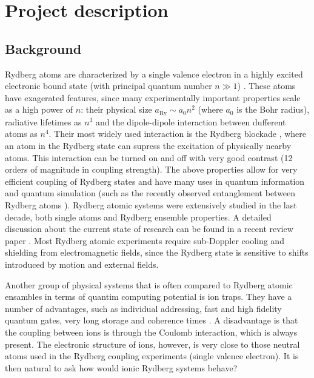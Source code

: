 \section{Project description}

\subsection{Background}

Rydberg atoms are characterized by a single valence electron in a highly excited electronic bound state (with principal quantum number $n \gg 1$) \cite{Gallagher1994}. These atoms have exagerated features, since many experimentally important properties scale as a high power of $n$: their physical size $a_{\mathrm{Ry}} \sim a_0 n^2$ (where $a_0$ is the Bohr radius), radiative lifetimes as $n^3$ and the dipole-dipole interaction between dufferent atoms as $n^4$. Their most widely used interaction is the Rydberg blockade \cite{Jaksch2000}, where an atom in the Rydberg state can supress the excitation of physically nearby atoms. This interaction can be turned on and off with very good contrast (12 orders of magnitude in coupling strength). The above properties allow for very efficient coupling of Rydberg states and have many uses in quantum information and quantum simulation (such as the recently observed entanglement between Rydberg atoms \cite{Wilk2010}). Rydberg atomic systems were extensively studied in the last decade, both single atoms and Rydberg ensemble properties. A detailed discussion about the current state of research can be found in a recent review paper \cite{Saffman2010}. Most Rydberg atomic experiments require sub-Doppler cooling and shielding from electromagnetic fields, since the Rydberg state is sensitive to shifts introduced by motion and external fields.

Another group of physical systems that is often compared to Rydberg atomic ensambles in terms of quantim computing potential is ion traps. They have a number of advantages, such as individual addressing, fast and high fidelity quantum gates, very long storage and coherence times \cite{Lucas2007}. A disadvantage is that the coupling between ions is through the Coulomb interaction, which is always present. The electronic structure of ions, however, is very close to those neutral atoms used in the Rydberg coupling experiments (single valence electron). It is then natural to ask how would ionic Rydberg systems behave?

